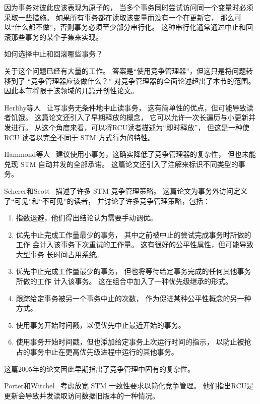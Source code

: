 因为事务对彼此应该表现为原子的，
当多个事务同时尝试访问同一个变量时必须采取一些措施。
如果所有事务都在读取该变量而没有一个在更新它，
那么可以``什么都不做''，否则事务必须至少部分串行化。
这种串行化通常通过中止和回滚那些事务的某个子集来实现。

如何选择中止和回滚哪些事务？

关于这个问题已经有大量的工作。
答案是``使用竞争管理器''，但这只是将问题转移到了
``竞争管理器应该做什么？''
对竞争管理器的全面论述超出了本节的范围。
因此本节将限于该领域的几篇开创性论文。

Herlihy等人~\cite{HerlihyLMS03}
让写事务无条件地中止读事务，
这有简单性的优点，但可能导致读者饥饿。
这篇论文还引入了早期释放的概念，
它可以允许一次长遍历与小更新并发进行。
从这个角度来看，可以将RCU读者描述为``即时释放''，
但这是一种使 RCU 读者以完全不同于 STM 方式行为的特性。

Hammond等人~\cite{LanceHammond2004a}
建议使用小事务，这确实降低了竞争管理器的复杂性，
但也未能兑现 STM 自动并发的全部承诺。
这篇论文还引入了注解来标识不同类型的事务。

Scherer和Scott~\cite{WilliamNSchererIII2005}
描述了许多 STM 竞争管理策略。
这篇论文为事务外访问定义了``可见''和``不可见''的读者，
并讨论了许多竞争管理策略，包括：

\begin{enumerate}
\item	指数退避，他们得出结论认为需要手动调优。
\item	优先中止完成工作量最少的事务，
	其中之前被中止的尝试完成事务时所做的工作
	会计入该事务下次重试的工作量。
	这有很好的公平性属性，但可能导致大型事务
	长时间占用系统。
\item	优先中止完成工作量最少的事务，
	但也将等待给定事务完成的任何其他事务所做的工作
	计入该事务。
	这在组合中加入了一种优先级继承的形式。
\item	跟踪给定事务被另一个事务中止的次数，
	作为促进某种公平性概念的另一种方式。
\item	使用事务开始时间戳，以便优先中止最近开始的事务。
\item	使用事务开始时间戳，但也添加给定事务上次运行时间的指示，
	以防止被抢占的事务中止在更高优先级进程中运行的其他事务。
\end{enumerate}

这篇2005年的论文因此早期指出了竞争管理中固有的复杂性。

Porter和Witchel~\cite{DonaldEPorter2007TRANSACT,Ramadan:2008:DTM:1521747.1521799}
考虑放宽 STM 一致性要求以简化竞争管理。
他们指出RCU是更新会导致并发读取访问数据旧版本的一种情况。

